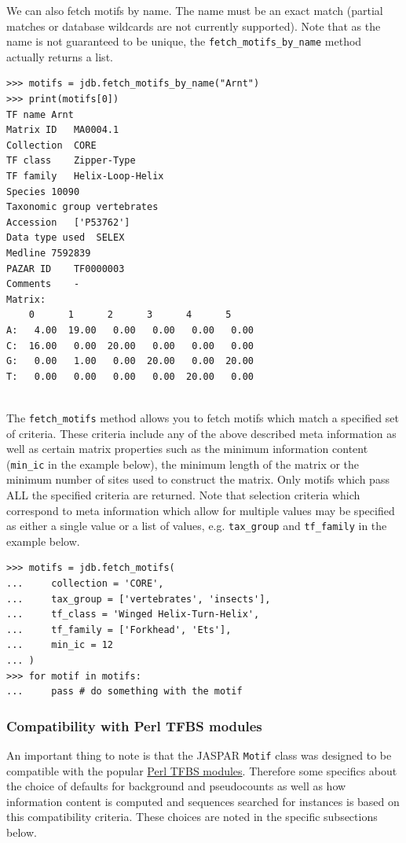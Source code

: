 \documentclass{report}
\begin{document}
We can also fetch motifs by name. The name must be an exact match (partial matches or database wildcards are not currently supported). Note that as the name is not guaranteed to be unique, the \verb+fetch_motifs_by_name+ method actually returns a list.
\begin{verbatim}
>>> motifs = jdb.fetch_motifs_by_name("Arnt")
>>> print(motifs[0])
TF name	Arnt
Matrix ID	MA0004.1
Collection	CORE
TF class	Zipper-Type
TF family	Helix-Loop-Helix
Species	10090
Taxonomic group	vertebrates
Accession	['P53762']
Data type used	SELEX
Medline	7592839
PAZAR ID	TF0000003
Comments	-
Matrix:
	0      1      2      3      4      5
A:   4.00  19.00   0.00   0.00   0.00   0.00
C:  16.00   0.00  20.00   0.00   0.00   0.00
G:   0.00   1.00   0.00  20.00   0.00  20.00
T:   0.00   0.00   0.00   0.00  20.00   0.00


\end{verbatim}

The \verb+fetch_motifs+ method allows you to fetch motifs which match a specified set of criteria. These criteria include any of the above described meta information as well as certain matrix properties such as the minimum information content (\verb+min_ic+ in the example below), the minimum length of the matrix or the minimum number of sites used to construct the matrix. Only motifs which pass ALL the specified criteria are returned. Note that selection criteria which correspond to meta information which allow for multiple values may be specified as either a single value or a list of values, e.g. \verb+tax_group+ and \verb+tf_family+ in the example below.
\begin{verbatim}
>>> motifs = jdb.fetch_motifs(
...     collection = 'CORE',
...     tax_group = ['vertebrates', 'insects'],
...     tf_class = 'Winged Helix-Turn-Helix',
...     tf_family = ['Forkhead', 'Ets'],
...     min_ic = 12
... )
>>> for motif in motifs:
...     pass # do something with the motif
\end{verbatim}

\subsubsection*{Compatibility with Perl TFBS modules}

An important thing to note is that the JASPAR \verb+Motif+ class was designed to be compatible with the popular \href{http://tfbs.genereg.net/}{Perl TFBS modules}. Therefore some specifics about the choice of defaults for background and pseudocounts as well as how information content is computed and sequences searched for instances is based on this compatibility criteria. These choices are noted in the specific subsections below.
\end{document}
